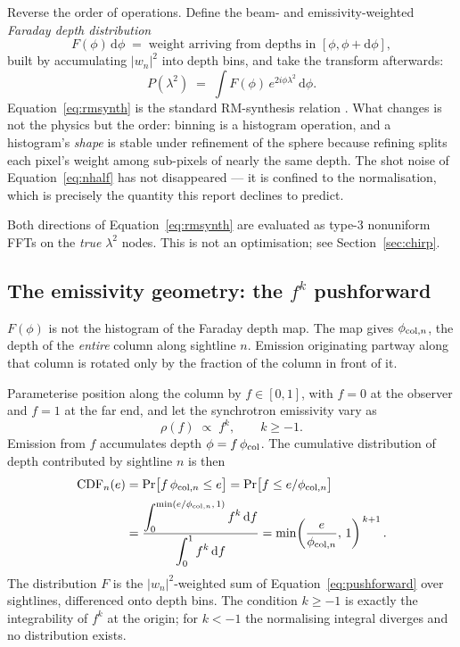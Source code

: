 \documentclass[11pt]{article}
\newcommand{\lamsq}{\ensuremath{\lambda^{2}}}
\begin{document}
Reverse the order of operations. Define the beam- and
emissivity-weighted \emph{Faraday depth distribution}
\begin{equation}
  F(\phi)\,\mathrm d\phi \;=\;
  \text{weight arriving from depths in } [\phi, \phi + \mathrm d\phi],
\end{equation}
built by accumulating $|w_n|^2$ into depth bins, and take the transform
afterwards:
\begin{equation}
  P(\lamsq) \;=\; \int F(\phi)\, e^{2i\phi\lamsq}\,\mathrm d\phi .
  \label{eq:rmsynth}
\end{equation}
Equation~\eqref{eq:rmsynth} is the standard RM-synthesis relation
\citep{burn1966,brentjens2005}. What changes is not the physics but the
order: binning is a histogram operation, and a histogram's \emph{shape}
is stable under refinement of the sphere because refining splits each
pixel's weight among sub-pixels of nearly the same depth. The shot noise
of Equation~\eqref{eq:nhalf} has not disappeared --- it is confined to
the normalisation, which is precisely the quantity this report declines to
predict.

Both directions of Equation~\eqref{eq:rmsynth} are evaluated as type-3
nonuniform FFTs \citep{barnett2019} on the \emph{true} \lamsq{} nodes.
This is not an optimisation; see Section~\ref{sec:chirp}.

\subsection{The emissivity geometry: the $f^k$ pushforward}
\label{sec:pushforward}

$F(\phi)$ is not the histogram of the Faraday depth map. The map gives
$\phi_{{\rm col},n}$, the depth of the \emph{entire} column along
sightline $n$. Emission originating partway along that column is rotated
only by the fraction of the column in front of it.

Parameterise position along the column by $f\in[0,1]$, with $f=0$ at the
observer and $f=1$ at the far end, and let the synchrotron emissivity
vary as
\begin{equation}
  \rho(f) \;\propto\; f^{k}, \qquad k \ge -1 .
\end{equation}
Emission from $f$ accumulates depth $\phi = f\,\phi_{\rm col}$. The
cumulative distribution of depth contributed by sightline $n$ is then
\begin{align}
  \mathrm{CDF}_n(e)
  &= \Pr\bigl[f\,\phi_{{\rm col},n} \le e\bigr]
   = \Pr\bigl[f \le e/\phi_{{\rm col},n}\bigr] \nonumber\\[2pt]
  &= \frac{\displaystyle\int_0^{\min(e/\phi_{{\rm col},n},\,1)} f^{k}\,
     \mathrm df}{\displaystyle\int_0^{1} f^{k}\,\mathrm df}
   = \min\!\left(\frac{e}{\phi_{{\rm col},n}},\,1\right)^{\,k+1}.
  \label{eq:pushforward}
\end{align}
The distribution $F$ is the $|w_n|^2$-weighted sum of
Equation~\eqref{eq:pushforward} over sightlines, differenced onto depth
bins. The condition $k \ge -1$ is exactly the integrability of $f^k$ at
the origin; for $k < -1$ the normalising integral diverges and no
distribution exists.
\end{document}
